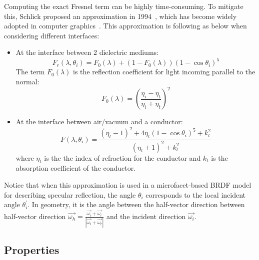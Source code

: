 \begin{itemize}
          Computing the exact Fresnel term can be highly time-consuming.
          To mitigate this, Schlick proposed an approximation in 1994~\cite{1994_Schlick}, which has become widely adopted in computer graphics~\cite{2005_Lazanyi,2021_Majercik}.
          This approximation is following as below when considering different interfaces:
          \begin{itemize}
              \item At the interface between 2 dielectric mediums:
                    \begin{equation}
                        \label{eq_fresnel_dielectric_schlick}
                        F_r(\lambda, \theta_i) = F_0(\lambda) + (1 - F_0(\lambda))(1-\cos\theta_i)^5
                    \end{equation}
                    The term $F_0(\lambda)$ is the reflection coefficient for light incoming parallel to the normal:
                    \[
                        F_0(\lambda) = \left(\frac{\eta_i - \eta_t}{\eta_i + \eta_t}\right)^2
                    \]
              \item At the interface between air/vacuum and a conductor:
                    \begin{equation}
                        \label{eq_fresnel_conductor_schlick}
                        F(\lambda, \theta_i) = \frac{(\eta_t -1)^2 + 4\eta_t(1-\cos\theta_i)^5 + k_t^2 }{(\eta_t +1)^2 + k_t^2}
                    \end{equation}
                    where $\eta_t $ is the the index of refraction for the conductor and $k_t$ is the absorption coefficient of the conductor.
          \end{itemize}
          Notice that when this approximation is used in a microfacet-based BRDF model for describing specular reflection, the angle $\theta_i$ corresponds to the local incident angle $\theta_i^\prime$.
          In geometry, it is the angle between the half-vector direction between half-vector direction $\overrightarrow{\omega_h} = \frac{\overrightarrow{\omega_i} + \overrightarrow{\omega_r}}{|\overrightarrow{\omega_i} + \overrightarrow{\omega_r}|}$ and the incident direction $\overrightarrow{\omega_i}$.

\end{itemize}

\subsection{Properties}

